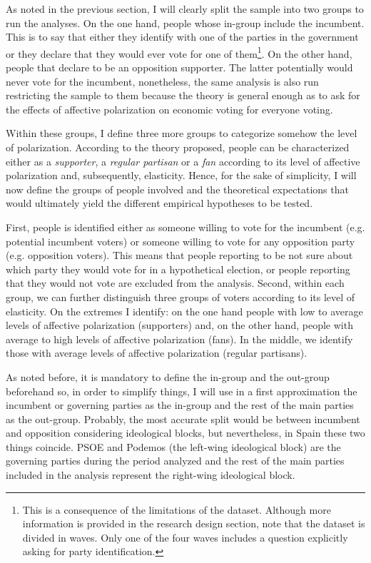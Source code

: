 \documentclass[a4paper, svgnames]{article}
\begin{document}
As noted in the previous section, I will clearly split the sample into two groups to run the analyses. On the one hand, people whose in-group include the incumbent. This is to say that either they identify with one of the parties in the government or they declare that they would ever vote for one of them\footnote{This is a consequence of the limitations of the dataset. Although more information is provided in the research design section, note that the dataset is divided in waves. Only one of the four waves includes a question explicitly asking for party identification.}. On the other hand, people that declare to be an opposition supporter. The latter potentially would never vote for the incumbent, nonetheless, the same analysis is also run restricting the sample to them because the theory is general enough as to ask for the effects of affective polarization on economic voting for everyone voting.

Within these groups, I define three more groups to categorize somehow the level of polarization. According to the theory proposed, people can be characterized either as a \textit{supporter}, a \textit{regular partisan} or a \textit{fan} according to its level of affective polarization and, subsequently, elasticity. Hence, for the sake of simplicity, I will now define the groups of people involved and the theoretical expectations that would ultimately yield the different empirical hypotheses to be tested.

First, people is identified either as someone willing to vote for the incumbent (e.g. potential incumbent voters) or someone willing to vote for any opposition party (e.g. opposition voters). This means that people reporting to be not sure about which party they would vote for in a hypothetical election, or people reporting that they would not vote are excluded from the analysis. Second, within each group, we can further distinguish three groups of voters according to its level of elasticity. On the extremes I identify: on the one hand people with low to average levels of affective polarization (supporters) and, on the other hand, people with average to high levels of affective polarization (fans). In the middle, we identify those with average levels of affective polarization (regular partisans).

As noted before, it is mandatory to define the in-group and the out-group beforehand so, in order to simplify things, I will use in a first approximation the incumbent or governing parties as the in-group and the rest of the main parties as the out-group. Probably, the most accurate split would be between incumbent and opposition considering ideological blocks, but nevertheless, in Spain these two things coincide. PSOE and Podemos (the left-wing ideological block) are the governing parties during the period analyzed and the rest of the main parties included in the analysis represent the right-wing ideological block.
\end{document}
